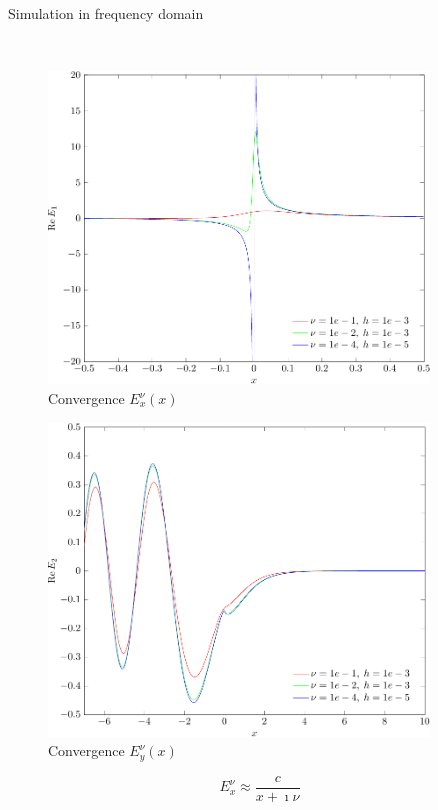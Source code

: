 \begin{frame}{Simulation in frequency domain}

\ \\

 \begin{minipage}{0.45\linewidth}
\begin{figure}
	\begin{center}
       	\includegraphics[width = 0.9\textwidth]{./images/picture2}
       	\caption{Convergence $E_x^\nu(x)$}
    \end{center}
\end{figure} 
\end{minipage}
\hfill
\begin{minipage}{0.45\linewidth}
	\begin{figure}
\begin{center}
       	\includegraphics[width = 0.9\textwidth]{./images/pics3}
       	\caption{Convergence $E^\nu_y(x)$}
    \end{center}
\end{figure} 
\end{minipage}
\[
E_x^\nu \approx \frac{c}{x + \imath \nu}
\]

\end{frame}
